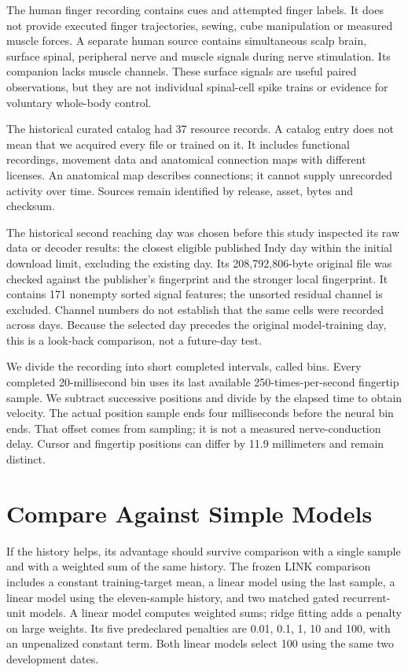 The human finger recording contains cues and attempted finger labels. It does
not provide executed finger trajectories, sewing, cube manipulation or measured
muscle forces. A separate human source contains simultaneous scalp brain,
surface spinal, peripheral nerve and muscle signals during nerve stimulation.
Its companion lacks muscle channels. These surface signals are useful paired
observations, but they are not individual spinal-cell spike trains or evidence
for voluntary whole-body control.\citep{human_fingers2023,spinal_dataset2023,spinal_companion2023}

The historical curated catalog had 37 resource records. A catalog entry does not mean that
we acquired every file or trained on it. It includes functional recordings,
movement data and anatomical connection maps with different licenses. An
anatomical map describes connections; it cannot supply unrecorded activity over
time. Sources remain identified by release, asset, bytes and checksum.

The historical second reaching day was chosen before this study inspected its raw data or decoder results: the closest eligible published Indy day within the initial download limit, excluding the existing day. Its 208,792,806-byte original file was checked against the publisher's fingerprint and the stronger local fingerprint. It contains 171 nonempty sorted signal features; the unsorted residual channel is excluded. Channel numbers do not establish that the same cells were recorded across days. Because the selected day precedes the original model-training day, this is a look-back comparison, not a future-day test.

We divide the recording into short completed intervals, called bins.
Every completed 20-millisecond bin uses its last available 250-times-per-second
fingertip sample. We subtract successive positions and divide by the elapsed
time to obtain velocity. The actual
position sample ends four milliseconds before the neural bin ends. That offset
comes from sampling; it is not a measured nerve-conduction delay. Cursor and
fingertip positions can differ by 11.9 millimeters and remain distinct.

\section{Compare Against Simple Models}

If the history helps, its advantage should survive comparison with a single sample and with a weighted sum of the same history. The frozen LINK comparison includes a constant training-target mean, a linear
model using the last sample, a linear model using the eleven-sample history,
and two matched gated recurrent-unit models. A linear model computes weighted
sums; ridge fitting adds a penalty on large weights. Its five predeclared
penalties are 0.01, 0.1, 1, 10 and 100, with an unpenalized constant term. Both
linear models select 100 using the same two development dates.


